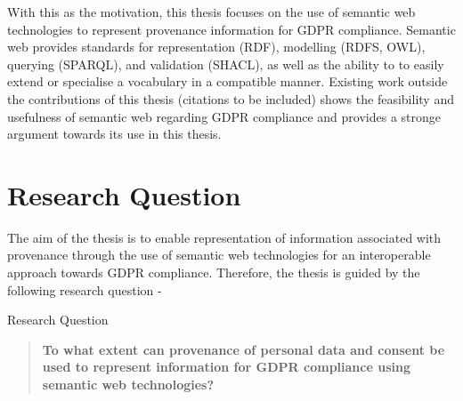 With this as the motivation, this thesis focuses on the use of semantic web technologies to represent provenance information for GDPR compliance. Semantic web provides standards for representation (RDF), modelling (RDFS, OWL), querying (SPARQL), and validation (SHACL), as well as the ability to to easily extend or specialise a vocabulary in a compatible manner. Existing work outside the contributions of this thesis (citations to be included) shows the feasibility and usefulness of semantic web regarding GDPR compliance and provides a stronge argument towards its use in this thesis.

\section{Research Question}
The aim of the thesis is to enable representation of information associated with provenance through the use of semantic web technologies for an interoperable approach towards GDPR compliance. Therefore, the thesis is guided by the following research question -
\begin{framed}
\small{Research Question}
\begin{quote}
\textbf{To what extent can provenance of personal data and consent be used to represent information for GDPR compliance using semantic web technologies?}
\end{quote}
\end{framed}

